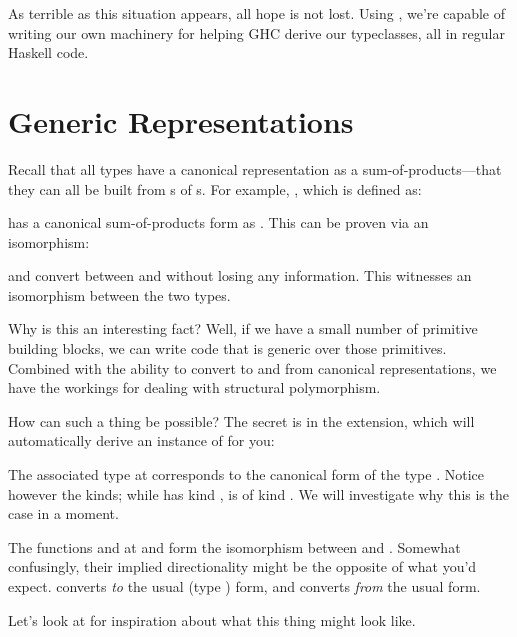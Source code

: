 \documentclass[book.tex]{subfiles}
\begin{document}
As terrible as this situation appears, all hope is not lost. Using
, we're capable of writing our own machinery for helping GHC
derive our typeclasses, all in regular Haskell code.


\section{Generic Representations}

Recall that all types have a canonical representation as a
sum-of-products---that they can all be built from s of \ty{(,)}s. For
example, , which is defined as:


 has a canonical sum-of-products form as . This can
be proven via an \gls{isomorphism}:


 and  convert between  and
 without losing any information. This witnesses an isomorphism
between the two types.

Why is this an interesting fact? Well, if we have a small number of primitive
building blocks, we can write code that is generic over those primitives.
Combined with the ability to convert to and from canonical representations, we
have the workings for dealing with structural polymorphism.

How can such a thing be possible? The secret is in the 
extension, which will automatically derive an instance of  for you:


The associated type  at  corresponds to the canonical form of
the type . Notice however the kinds; while  has kind ,
 is of kind . We will investigate why this is the
case in a moment.

The functions  and  at  and  form the isomorphism
between  and . Somewhat confusingly, their implied
directionality might be the opposite of what you'd expect.  converts
\emph{to} the usual (type ) form, and  converts \emph{from} the
usual form.

Let's look at  for inspiration about what this thing might look
like.
\end{document}
